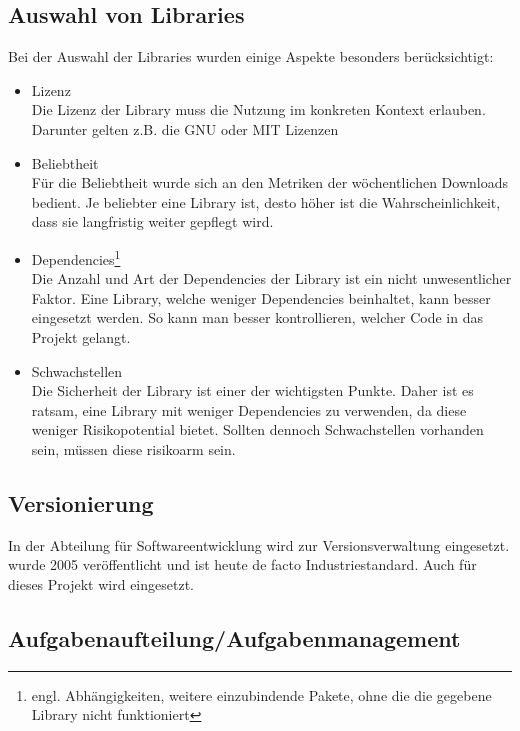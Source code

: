 \subsection{Auswahl von Libraries}
\label{sec:Durchführungsphase:AuswahlVonLibraries}

Bei der Auswahl der Libraries wurden einige Aspekte besonders berücksichtigt:

\begin{itemize}
    \item Lizenz\\
    Die Lizenz der Library muss die Nutzung im konkreten Kontext erlauben. Darunter gelten z.B. die GNU oder MIT Lizenzen
    \item Beliebtheit\\
    Für die Beliebtheit wurde sich an den Metriken der wöchentlichen Downloads bedient. Je beliebter eine Library ist, desto höher ist die Wahrscheinlichkeit, dass sie langfristig weiter gepflegt wird.
    \item Dependencies\footnote{engl. Abhängigkeiten, weitere einzubindende Pakete, ohne die die gegebene Library nicht funktioniert}\\
	Die Anzahl und Art der Dependencies der Library ist ein nicht unwesentlicher Faktor. Eine Library, welche weniger Dependencies beinhaltet, kann besser eingesetzt werden. So kann man besser kontrollieren, welcher Code in das Projekt gelangt.
	\item Schwachstellen\\
	Die Sicherheit der Library ist einer der wichtigsten Punkte. Daher ist es ratsam, eine Library mit weniger Dependencies zu verwenden, da diese weniger Risikopotential bietet. Sollten dennoch Schwachstellen vorhanden sein, müssen diese risikoarm sein.
\end{itemize}

\subsection{Versionierung}

In der Abteilung für Softwareentwicklung wird  zur Versionsverwaltung eingesetzt.  wurde 2005 veröffentlicht und ist heute de facto Industriestandard. Auch für dieses Projekt wird  eingesetzt.

\subsection{Aufgabenaufteilung/Aufgabenmanagement}

